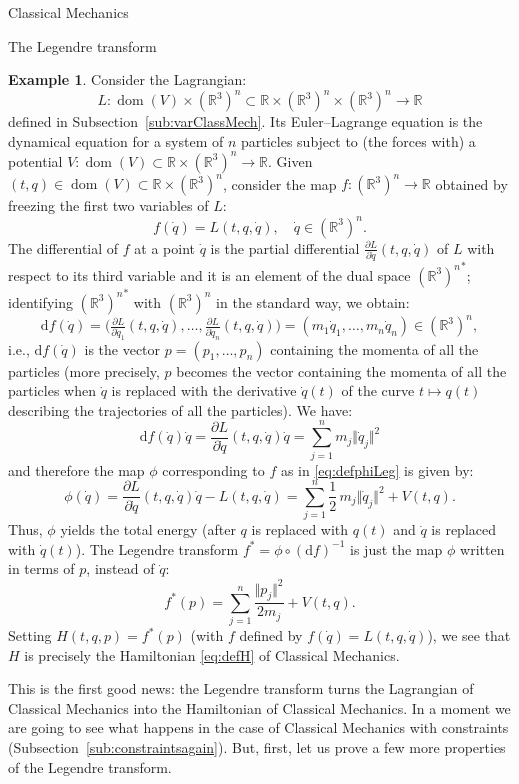 \documentclass[oneside,a4paper,11pt]{amsbook}
\newcommand{\R}{\mathds R}
\newcommand{\dd}{\mathrm d}
\DeclareMathOperator{\Dom}{dom}
\theoremstyle{remark}\newtheorem{exercise}{Exercise}[chapter]
\theoremstyle{plain}\newtheorem{teo}{Theorem}[section]
\theoremstyle{plain}\newtheorem{lem}[teo]{Lemma}
\theoremstyle{plain}\newtheorem{prop}[teo]{Proposition}
\theoremstyle{plain}\newtheorem{cor}[teo]{Corollary}
\theoremstyle{definition}\newtheorem{defin}[teo]{Definition}
\theoremstyle{remark}\newtheorem{rem}[teo]{Remark}
\theoremstyle{definition}\newtheorem{notation}[teo]{Notation}
\theoremstyle{definition}\newtheorem{convention}[teo]{Convention}
\theoremstyle{definition}\newtheorem{example}[teo]{Example}
\numberwithin{section}{chapter}
\numberwithin{equation}{section}
\begin{document}
\begin{chapter}{Classical Mechanics}
\begin{section}{The Legendre transform}
\begin{example}\label{exa:LegtransLagMech}
Consider the Lagrangian:
\[L:\Dom(V)\times(\R^3)^n\subset\R\times(\R^3)^n\times(\R^3)^n\to\R\]
defined in Subsection~\ref{sub:varClassMech}. Its Euler--Lagrange equation is the dynamical equation for a system of $n$ particles subject to (the
forces with) a potential $V:\Dom(V)\subset\R\times(\R^3)^n\to\R$. Given $(t,q)\in\Dom(V)\subset\R\times(\R^3)^n$,
consider the map $f:(\R^3)^n\to\R$ obtained by freezing the first two variables of $L$:
\[f(\dot q)=L(t,q,\dot q),\quad\dot q\in(\R^3)^n.\]
The differential of $f$ at a point $\dot q$ is the partial differential $\frac{\partial L}{\partial\dot q}(t,q,\dot q)$
of $L$ with respect to its third variable and it is an element of the dual space ${(\R^3)^n}^*$; identifying ${(\R^3)^n}^*$ with
$(\R^3)^n$ in the standard way, we obtain:
\[\dd f(\dot q)=\big(\tfrac{\partial L}{\partial\dot q_1}(t,q,\dot q),\ldots,
\tfrac{\partial L}{\partial\dot q_n}(t,q,\dot q)\big)=(m_1\dot q_1,\ldots,m_n\dot q_n)\in(\R^3)^n,\]
i.e., $\dd f(\dot q)$ is the vector $p=(p_1,\ldots,p_n)$ containing the momenta of all the particles
(more precisely, $p$ becomes the vector containing the momenta of all the particles when $\dot q$ is replaced with
the derivative $\dot q(t)$ of the curve $t\mapsto q(t)$ describing the trajectories of all the particles). We have:
\[\dd f(\dot q)\dot q=\frac{\partial L}{\partial\dot q}(t,q,\dot q)\dot q=\sum_{j=1}^nm_j\Vert\dot q_j\Vert^2\]
and therefore the map $\phi$ corresponding to $f$ as in \eqref{eq:defphiLeg} is given by:
\[\phi(\dot q)=\frac{\partial L}{\partial\dot q}(t,q,\dot q)\dot q-L(t,q,\dot q)
=\sum_{j=1}^n\frac12\,m_j\Vert\dot q_j\Vert^2+V(t,q).\]
Thus, $\phi$ yields the total energy (after $q$ is replaced with $q(t)$ and $\dot q$ is replaced with $\dot q(t)$).
The Legendre transform $f^*=\phi\circ(\dd f)^{-1}$ is just the map $\phi$ written in terms of $p$, instead of $\dot q$:
\[f^*(p)=\sum_{j=1}^n\frac{\Vert p_j\Vert^2}{2m_j}+V(t,q).\]
Setting $H(t,q,p)=f^*(p)$ (with $f$ defined by $f(\dot q)=L(t,q,\dot q)$), we see that $H$ is precisely the Hamiltonian \eqref{eq:defH} of Classical Mechanics.
\end{example}

This is the first good news: the Legendre transform turns the Lagrangian of Classical Mechanics into
the Hamiltonian of Classical Mechanics. In a moment we are going to see what happens in the case of Classical
Mechanics with constraints (Subsection~\ref{sub:constraintsagain}).
But, first, let us prove a few more properties of the Legendre transform.


\end{section}
\end{chapter}
\end{document}

